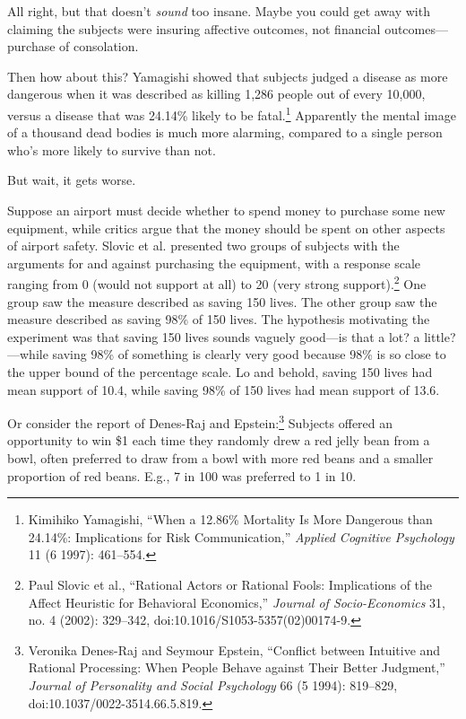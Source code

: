 {
 All right, but that doesn't \textit{sound} too
insane. Maybe you could get away with claiming the subjects were
insuring affective outcomes, not financial outcomes---purchase of
consolation.}

{
 Then how about this? Yamagishi showed that subjects judged a
disease as more dangerous when it was described as killing 1,286 people
out of every 10,000, versus a disease that was 24.14\% likely to be
fatal.\footnote{Kimihiko Yamagishi, ``When a 12.86\% Mortality
Is More Dangerous than 24.14\%: Implications for Risk
Communication,'' \textit{Applied Cognitive
Psychology} 11 (6 1997): 461--554.} Apparently the mental image of a thousand
dead bodies is much more alarming, compared to a single person
who's more likely to survive than not.}

{
 But wait, it gets worse.}

{
 Suppose an airport must decide whether to spend money to purchase
some new equipment, while critics argue that the money should be spent
on other aspects of airport safety. Slovic et al. presented two groups
of subjects with the arguments for and against purchasing the
equipment, with a response scale ranging from 0 (would not support at
all) to 20 (very strong support).\footnote{Paul Slovic et al., ``Rational Actors or
Rational Fools: Implications of the Affect Heuristic for Behavioral
Economics,'' \textit{Journal of Socio-Economics} 31,
no. 4 (2002): 329--342, doi:10.1016/S1053-5357(02)00174-9.} One group saw the
measure described as saving 150 lives. The other group saw the measure
described as saving 98\% of 150 lives. The hypothesis motivating the
experiment was that saving 150 lives sounds vaguely good---is that a
lot? a little?---while saving 98\% of something is clearly very good
because 98\% is so close to the upper bound of the percentage scale. Lo
and behold, saving 150 lives had mean support of 10.4, while saving
98\% of 150 lives had mean support of 13.6.}

{
 Or consider the report of Denes-Raj and
Epstein:\footnote{Veronika Denes-Raj and Seymour Epstein,
``Conflict between Intuitive and Rational Processing:
When People Behave against Their Better Judgment,''
\textit{Journal of Personality and Social Psychology} 66 (5 1994):
819--829, doi:10.1037/0022-3514.66.5.819.} Subjects offered an opportunity to win \$1
each time they randomly drew a red jelly bean from a bowl, often
preferred to draw from a bowl with more red beans and a smaller
proportion of red beans. E.g., 7 in 100 was preferred to 1 in 10.}

